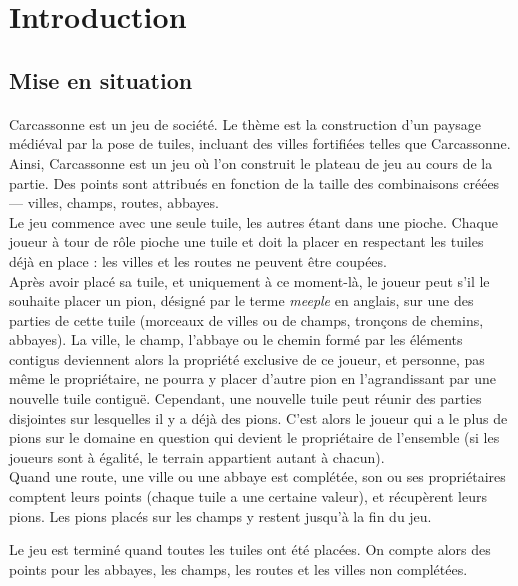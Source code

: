 \documentclass[12pt]{article}
\begin{document}
\section{Introduction}

\subsection{Mise en situation}

\paragraph{} Carcassonne est un jeu de société. Le thème est la construction d'un paysage médiéval par la pose de tuiles, incluant des villes fortifiées telles que Carcassonne.
Ainsi, Carcassonne est un jeu où l'on construit le plateau de jeu au cours de la partie. Des points sont attribués en fonction de la taille des combinaisons créées — villes, champs, routes, abbayes.\\

Le jeu commence avec une seule tuile, les autres étant dans une pioche. Chaque joueur à tour de rôle pioche une tuile et doit la placer en respectant les tuiles déjà en place : les villes et les routes ne peuvent être coupées.\\

Après avoir placé sa tuile, et uniquement à ce moment-là, le joueur peut s'il le souhaite placer un pion, désigné par le terme \textit{meeple} en anglais, sur une des parties de cette tuile (morceaux de villes ou de champs, tronçons de chemins, abbayes). La ville, le champ, l'abbaye ou le chemin formé par les éléments contigus deviennent alors la propriété exclusive de ce joueur, et personne, pas même le propriétaire, ne pourra y placer d'autre pion en l'agrandissant par une nouvelle tuile contiguë. Cependant, une nouvelle tuile peut réunir des parties disjointes sur lesquelles il y a déjà des pions. C'est alors le joueur qui a le plus de pions sur le domaine en question qui devient le propriétaire de l'ensemble (si les joueurs sont à égalité, le terrain appartient autant à chacun).\\

Quand une route, une ville ou une abbaye est complétée, son ou ses propriétaires comptent leurs points (chaque tuile a une certaine valeur), et récupèrent leurs pions. Les pions placés sur les champs y restent jusqu'à la fin du jeu.\newline

Le jeu est terminé quand toutes les tuiles ont été placées. On compte alors des points pour les abbayes, les champs, les routes et les villes non complétées.\newline
\end{document}
